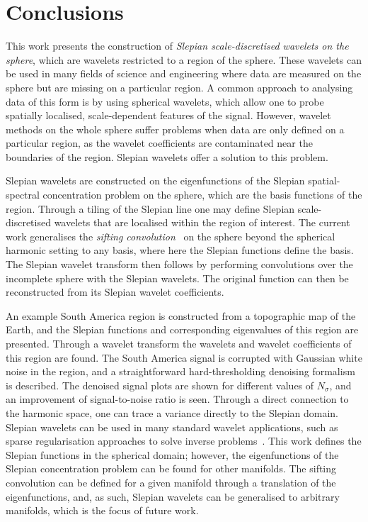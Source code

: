 

\section{Conclusions}\label{sec:chapter4_conclusion}

This work presents the construction of \emph{Slepian scale-discretised wavelets on the sphere}, which are wavelets restricted to a region of the sphere.
These wavelets can be used in many fields of science and engineering where data are measured on the sphere but are missing on a particular region.
A common approach to analysing data of this form is by using spherical wavelets, which allow one to probe spatially localised, scale-dependent features of the signal.
However, wavelet methods on the whole sphere suffer problems when data are only defined on a particular region, as the wavelet coefficients are contaminated near the boundaries of the region.
Slepian wavelets offer a solution to this problem.

Slepian wavelets are constructed on the eigenfunctions of the Slepian spatial-spectral concentration problem on the sphere, which are the basis functions of the region.
Through a tiling of the Slepian line one may define Slepian scale-discretised wavelets that are localised within the region of interest.
The current work generalises the \emph{sifting convolution}~\autocite{Roddy2021} on the sphere beyond the spherical harmonic setting to any basis, where here the Slepian functions define the basis.
The Slepian wavelet transform then follows by performing convolutions over the incomplete sphere with the Slepian wavelets.
The original function can then be reconstructed from its Slepian wavelet coefficients.

An example South America region is constructed from a topographic map of the Earth, and the Slepian functions and corresponding eigenvalues of this region are presented.
Through a wavelet transform the wavelets and wavelet coefficients of this region are found.
The South America signal is corrupted with Gaussian white noise in the region, and a straightforward hard-thresholding denoising formalism is described.
The denoised signal plots are shown for different values of \(N_{\sigma}\), and an improvement of signal-to-noise ratio is seen.
Through a direct connection to the harmonic space, one can trace a variance directly to the Slepian domain.
Slepian wavelets can be used in many standard wavelet applications, such as sparse regularisation approaches to solve inverse problems~\autocite{McEwen2013a,Wallis2017,Price2021}.
This work defines the Slepian functions in the spherical domain; however, the eigenfunctions of the Slepian concentration problem can be found for other manifolds.
The sifting convolution can be defined for a given manifold through a translation of the eigenfunctions, and, as such, Slepian wavelets can be generalised to arbitrary manifolds, which is the focus of future work.

